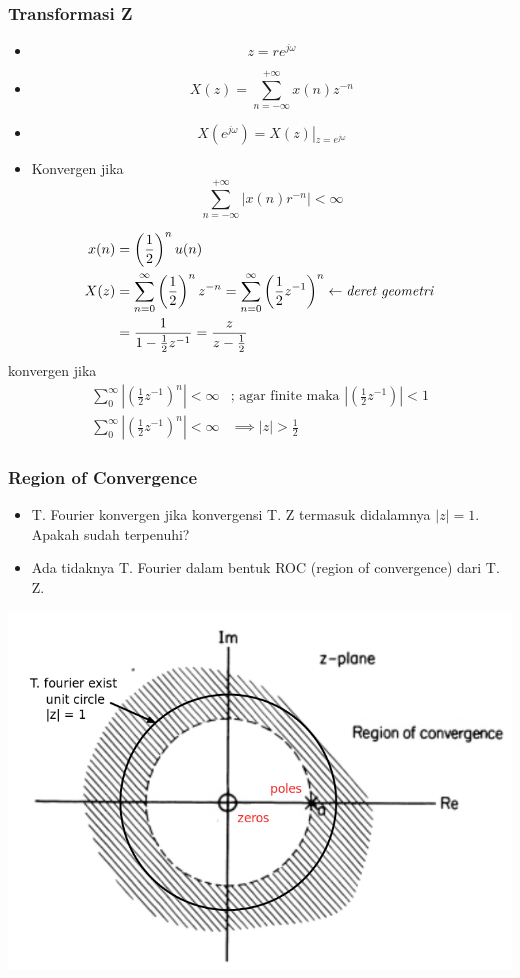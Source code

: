 \documentclass[pdflatex,compress,mathserif]{beamer}
\begin{document}
\begin{frame}
	\frametitle{Transformasi Z}
	\begin{itemize}
		\item[] \[ z = re^{j\omega} \]
		\item[] \[ X(z) = \sum_{n = -\infty}^{+\infty} x(n)z^{-n} \]
		\item[] \[ X(e^{j\omega}) = X(z)\left|_{z = e^{j \omega}}\right. \]
		\item[] Konvergen jika
		\[ \sum\limits_{n = -\infty}^{+\infty} |x(n)r^{-n}| < \infty \]
	\end{itemize}
\end{frame}

\begin{frame}
	\begin{align*}
		x(n) &= \left(\frac{1}{2}\right)^n u(n) \\
		X(z) &= \sum\limits_{n=0}^{\infty} \left(\frac{1}{2}\right)^n z^{-n} = \sum\limits_{n=0}^{\infty} \left(\frac{1}{2} z^{-1}\right)^n \leftarrow \text{\textit{deret geometri}}\\
		&= \frac{1}{1 - \frac{1}{2}z^{-1}} = \frac{z}{z - \frac{1}{2}}
	\end{align*}
	konvergen jika
	\begin{align*}
		\sum_{0}^{\infty} \left| \left(\frac{1}{2} z^{-1}\right)^n \right| < \infty &\text{;} \text{ agar finite maka }\left| \left(\frac{1}{2} z^{-1}\right) \right| < 1 \\
		\sum_{0}^{\infty} \left| \left(\frac{1}{2} z^{-1}\right)^n \right| < \infty&\implies |z| > \frac{1}{2}
	\end{align*}
\end{frame}

\begin{frame}
	\frametitle{Region of Convergence}
	\begin{itemize}
		\item T. Fourier konvergen jika konvergensi T. Z termasuk didalamnya $ |z| = 1 $. Apakah sudah terpenuhi?
		\item Ada tidaknya T. Fourier dalam bentuk ROC (region of convergence) dari T. Z.
	\end{itemize}
	\begin{center}
		\includegraphics[width=0.7\linewidth]{img/img01}
	\end{center}
\end{frame}
\end{document}
